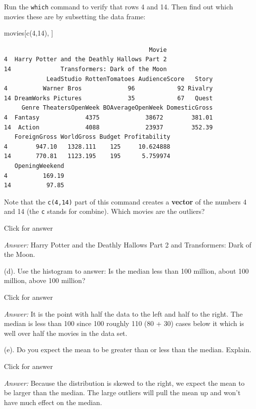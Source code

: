 \documentclass[
]{book}
\newenvironment{Shaded}{\begin{snugshade}}{\end{snugshade}}
\newcommand{\DecValTok}[1]{\textcolor[rgb]{0.00,0.00,0.81}{#1}}
\newcommand{\FunctionTok}[1]{\textcolor[rgb]{0.00,0.00,0.00}{#1}}
\newcommand{\NormalTok}[1]{#1}
\begin{document}
Run the \texttt{which} command to verify that rows 4 and 14. Then find out which movies these are by subsetting the data frame:

\begin{Shaded}
\begin{Highlighting}[]
\NormalTok{movies[}\FunctionTok{c}\NormalTok{(}\DecValTok{4}\NormalTok{,}\DecValTok{14}\NormalTok{), ]}
\end{Highlighting}
\end{Shaded}

\begin{verbatim}
                                         Movie
4  Harry Potter and the Deathly Hallows Part 2
14              Transformers: Dark of the Moon
            LeadStudio RottenTomatoes AudienceScore   Story
4          Warner Bros             96            92 Rivalry
14 DreamWorks Pictures             35            67   Quest
     Genre TheatersOpenWeek BOAverageOpenWeek DomesticGross
4  Fantasy             4375             38672        381.01
14  Action             4088             23937        352.39
   ForeignGross WorldGross Budget Profitability
4        947.10   1328.111    125     10.624888
14       770.81   1123.195    195      5.759974
   OpeningWeekend
4          169.19
14          97.85
\end{verbatim}

Note that the \texttt{c(4,14)} part of this command creates a \textbf{vector} of the numbers 4 and 14 (the \texttt{c} stands for combine). Which movies are the outliers?

Click for answer

\emph{Answer:} Harry Potter and the Deathly Hallows Part 2 and Transformers: Dark of the Moon.

(d). Use the histogram to answer: Is the median less than 100 million, about 100 million, above 100 million?

Click for answer

\emph{Answer:} It is the point with half the data to the left and half to the right. The median is less than 100
since 100 roughly 110 (80 + 30) cases below it which is well over half the movies in the data set.

(e). Do you expect the mean to be greater than or less than the median. Explain.

Click for answer

\emph{Answer:} Because the distribution is skewed to the right, we expect the mean to be larger than the median.
The large outliers will pull the mean up and won't have much effect on the median.
\end{document}
